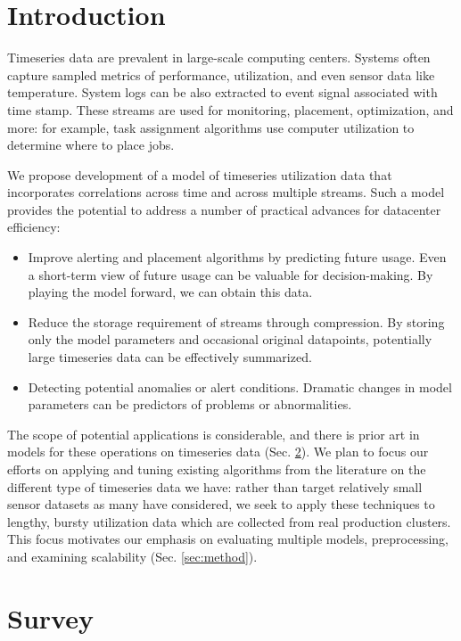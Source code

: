 \section{Introduction}
\label{sec:intro}
Timeseries data are prevalent in large-scale computing centers. Systems often capture sampled metrics of performance, utilization, and even sensor data like temperature. System logs can be also extracted to event signal associated with time stamp. These streams are used for monitoring, placement, optimization, and more: for example, task assignment algorithms use computer utilization to determine where to place jobs.

We propose development of a model of timeseries utilization data that incorporates correlations across time and across multiple streams. Such a model provides the potential to address a number of practical advances for datacenter efficiency:
\begin{itemize}
\item Improve alerting and placement algorithms by predicting future usage. Even a short-term view of future usage can be valuable for decision-making. By playing the model forward, we can obtain this data.
\item Reduce the storage requirement of streams through compression. By storing only the model parameters and occasional original datapoints, potentially large timeseries data can be effectively summarized.
\item Detecting potential anomalies or alert conditions. Dramatic changes in model parameters can be predictors of problems or abnormalities.
\end{itemize}

The scope of potential applications is considerable, and there is prior art in models for these operations on timeseries data (Sec. \ref{sec:survey}). We plan to focus our efforts on applying and tuning existing algorithms from the literature on the different type of timeseries data we have: rather than target  relatively small sensor datasets as many have considered, we seek to apply these techniques to lengthy, bursty utilization data which are collected from real production clusters. This focus motivates our emphasis on evaluating multiple models, preprocessing, and examining scalability (Sec. \ref{sec:method}).

\section{Survey}
\label{sec:survey}

